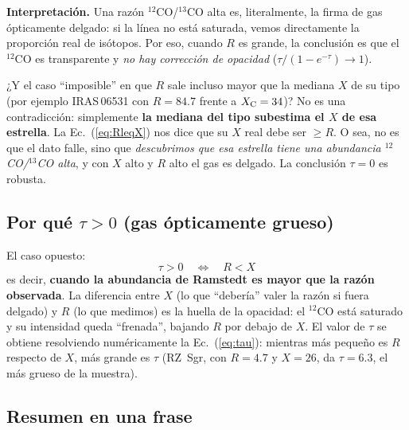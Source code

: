 \documentclass[12pt, a4paper]{article}
\begin{document}
\noindent \textbf{Interpretación.} Una razón $^{12}$CO/$^{13}$CO alta es, literalmente, la
firma de gas ópticamente delgado: si la línea no está saturada, vemos directamente la
proporción real de isótopos. Por eso, cuando $R$ es grande, la conclusión es que el
$^{12}$CO es transparente y \emph{no hay corrección de opacidad} ($\tau/(1-e^{-\tau})\to1$).

¿Y el caso ``imposible'' en que $R$ sale incluso mayor que la mediana $X$ de su tipo (por
ejemplo IRAS\,06531 con $R=84.7$ frente a $X_{\rm C}=34$)? No es una contradicción:
simplemente \textbf{la mediana del tipo subestima el $X$ de esa estrella}. La
Ec.~(\ref{eq:RleqX}) nos dice que su $X$ real debe ser $\geq R$. O sea, no es que el dato
falle, sino que \emph{descubrimos que esa estrella tiene una abundancia $^{12}$CO/$^{13}$CO
alta}, y con $X$ alto y $R$ alto el gas es delgado. La conclusión $\tau=0$ es robusta.

\subsection{Por qué $\tau > 0$ (gas ópticamente grueso)}

El caso opuesto:
\begin{equation}
    \boxed{\;\tau > 0 \quad\Longleftrightarrow\quad R < X\;}
\end{equation}
es decir, \textbf{cuando la abundancia de Ramstedt es mayor que la razón observada}. La
diferencia entre $X$ (lo que ``debería'' valer la razón si fuera delgado) y $R$ (lo que
medimos) es la huella de la opacidad: el $^{12}$CO está saturado y su intensidad queda
``frenada'', bajando $R$ por debajo de $X$. El valor de $\tau$ se obtiene resolviendo
numéricamente la Ec.~(\ref{eq:tau}): mientras más pequeño es $R$ respecto de $X$, más grande
es $\tau$ (RZ~Sgr, con $R=4.7$ y $X=26$, da $\tau=6.3$, el más grueso de la muestra).

\subsection{Resumen en una frase}

\begin{center}
\end{center}
\end{document}
